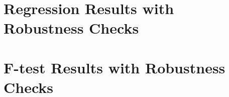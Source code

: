 \restoregeometry
\section*{Regression Results with Robustness Checks}




\section*{F-test Results with Robustness Checks}








